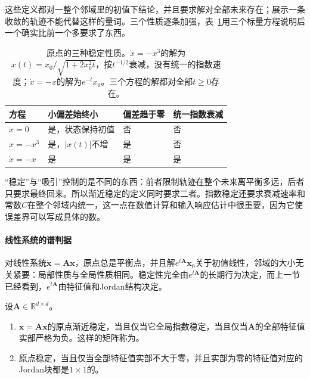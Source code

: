 这些定义都对一整个邻域里的初值下结论，并且要求解对全部未来存在；展示一条收敛的轨迹不能代替这样的量词。三个性质逐条加强，表~\ref{tab:ode-stability-types}用三个标量方程说明后一个确实比前一个多要求了东西。

\begin{table}[htbp]
  \centering
  \begin{tabular}{llll}
    \toprule
    方程 & 小偏差始终小 & 偏差趋于零 & 统一指数衰减\\
    \midrule
    $\dot x=0$ & 是，状态保持初值 & 否 & 否\\
    $\dot x=-x^3$ & 是，$|x(t)|$不增 & 是 & 否\\
    $\dot x=-x$ & 是 & 是 & 是\\
    \bottomrule
  \end{tabular}
  \caption{原点的三种稳定性质。$\dot x=-x^3$的解为$x(t)=x_0/\sqrt{1+2x_0^2t}$，按$t^{-1/2}$衰减，没有统一的指数速度；$\dot x=-x$的解为$e^{-t}x_0$。三个方程的解都对全部$t\geq0$存在。}
  \label{tab:ode-stability-types}
\end{table}

“稳定”与“吸引”控制的是不同的东西：前者限制轨迹在整个未来离平衡多远，后者只要求最终回来。所以渐近稳定的定义同时要求二者。指数稳定还要求衰减速率和常数$C$在整个邻域内统一，这一点在数值计算和输入响应估计中很重要，因为它使误差界可以写成具体的数。

\paragraph{线性系统的谱判据}
对线性系统$\dot{\bm x}=\bm A\bm x$，原点总是平衡点，并且解$e^{t\bm A}\bm x_0$关于初值线性，邻域的大小无关紧要：局部性质与全局性质相同。稳定性完全由$e^{t\bm A}$的长期行为决定，而上一节已经看到，$e^{t\bm A}$由特征值和Jordan结构决定。

\begin{theorem}[线性系统的谱判据]
  \label{thm:ode-linear-spectral-stability}
  设$\bm A\in\mathbb R^{d\times d}$。
  \begin{enumerate}
    \item $\dot{\bm x}=\bm A\bm x$的原点渐近稳定，当且仅当它全局指数稳定，当且仅当$\bm A$的全部特征值实部严格为负。这样的矩阵称为。
    \item 原点稳定，当且仅当全部特征值实部不大于零，并且实部为零的特征值对应的Jordan块都是$1\times1$的。
  \end{enumerate}
\end{theorem}

